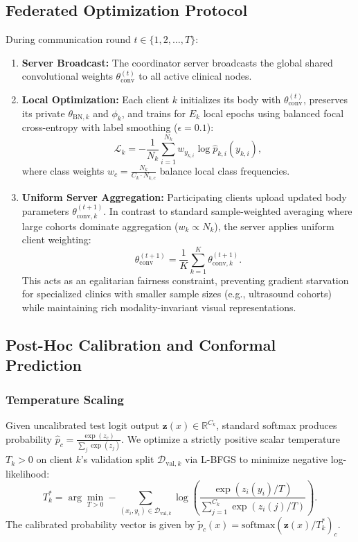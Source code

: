 \documentclass[journal]{IEEEtran}
\begin{document}
\subsection{Federated Optimization Protocol}
During communication round $t \in \{1, 2, \dots, T\}$:
\begin{enumerate}
    \item \textbf{Server Broadcast:} The coordinator server broadcasts the global shared convolutional weights $\theta_{\text{conv}}^{(t)}$ to all active clinical nodes.
    \item \textbf{Local Optimization:} Each client $k$ initializes its body with $\theta_{\text{conv}}^{(t)}$, preserves its private $\theta_{\text{BN}, k}$ and $\phi_k$, and trains for $E_k$ local epochs using balanced focal cross-entropy with label smoothing ($\epsilon=0.1$):
    \begin{equation}
    \mathcal{L}_k = -\frac{1}{N_k} \sum_{i=1}^{N_k} w_{y_{k,i}} \log \hat{p}_{k,i}(y_{k,i}),
    \end{equation}
    where class weights $w_c = \frac{N_k}{C_k \cdot N_{k,c}}$ balance local class frequencies.
    \item \textbf{Uniform Server Aggregation:} Participating clients upload updated body parameters $\theta_{\text{conv}, k}^{(t+1)}$. In contrast to standard sample-weighted averaging where large cohorts dominate aggregation ($w_k \propto N_k$), the server applies uniform client weighting:
    \begin{equation}
    \theta_{\text{conv}}^{(t+1)} = \frac{1}{K} \sum_{k=1}^K \theta_{\text{conv}, k}^{(t+1)}.
    \end{equation}
    This acts as an egalitarian fairness constraint, preventing gradient starvation for specialized clinics with smaller sample sizes (e.g., ultrasound cohorts) while maintaining rich modality-invariant visual representations.
\end{enumerate}

\subsection{Post-Hoc Calibration and Conformal Prediction}

\subsubsection{Temperature Scaling}
Given uncalibrated test logit output $\mathbf{z}(x) \in \mathbb{R}^{C_k}$, standard softmax produces probability $\hat{p}_c = \frac{\exp(z_c)}{\sum_j \exp(z_j)}$. We optimize a strictly positive scalar temperature $T_k > 0$ on client $k$'s validation split $\mathcal{D}_{\text{val}, k}$ via L-BFGS to minimize negative log-likelihood:
\begin{equation}
T_k^* = \arg\min_{T > 0} -\sum_{(x_i, y_i) \in \mathcal{D}_{\text{val}, k}} \log \left( \frac{\exp(z_i(y_i) / T)}{\sum_{j=1}^{C_k} \exp(z_i(j) / T)} \right).
\end{equation}
The calibrated probability vector is given by $\tilde{p}_c(x) = \text{softmax}(\mathbf{z}(x) / T_k^*)_c$.
\end{document}
